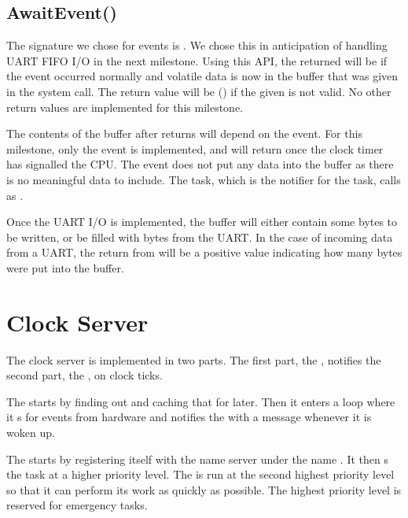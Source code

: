 \documentclass[pdftex,10pt,a4paper]{article}
\begin{document}
{{\subsection*{AwaitEvent()}

The signature we chose for events is
. We chose
this in anticipation of handling UART FIFO I/O in the next
milestone. Using this API, the returned  will be  if
the event occurred normally and volatile data is now in the
 buffer that was given in the system call. The return value
will be  () if the given  is
not valid. No other return values are implemented for this milestone.

The contents of the  buffer after  returns
will depend on the event. For this milestone, only the
 event is implemented, and will return once the clock
timer has signalled the CPU. The  event does not put
any data into the  buffer as there is no meaningful data to
include. The  task, which is the notifier for the
 task, calls  as
.

Once the UART I/O is implemented, the  buffer will either
contain some bytes to be written, or be filled with bytes from the
UART. In the case of incoming data from a UART, the return from
 will be a positive value indicating how many bytes
were put into the  buffer.

\section*{Clock Server}

The clock server is implemented in two parts. The first part, the
, notifies the second part, the
, on clock ticks.

The  starts by finding out 
and caching that  for later. Then it enters a 
loop where it s for  events from hardware
and notifies the  with a  message whenever it
is woken up.

The  starts by registering itself with the name
server under the name . It then s the
 task at a higher priority level. The
 is run at the second highest priority level so
that it can perform its work as quickly as possible. The highest
priority level is reserved for emergency tasks.

}}
\end{document}
